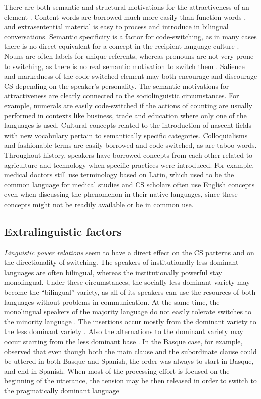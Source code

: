 \documentclass[output=paper,
modfonts
]{langscibook}
\begin{document}
There are both semantic and structural motivations for the attractiveness of an element \parencite{johanson2002contact}. Content words are borrowed much more easily than function words \parencite{backus2013usage}, and extrasentential material is easy to process and introduce in bilingual conversations. Semantic specificity is a factor for code-switching, as in many cases there is no direct equivalent for a concept in the recipient-language culture \parencite{backus2001role}. Nouns are often labels for unique referents, whereas pronouns are not very prone to switching, as there is no real semantic motivation to switch them \parencite[pp. 133]{matras2009language}. Salience and markedness of the code-switched element may both encourage and discourage CS depending on the speaker’s personality. The semantic motivations for attractiveness are clearly connected to the sociolinguistic circumstances. For example, numerals are easily code-switched if the actions of counting are usually performed in contexts like business, trade and education where only one of the languages is used. Cultural concepts related to the introduction of nascent fields with new vocabulary pertain to semantically specific categories. Colloquialisms and fashionable terms are easily borrowed and code-switched, as are taboo words. Throughout history, speakers have borrowed concepts from each other related to agriculture and technology when specific practices were introduced. For example, medical doctors still use terminology based on Latin, which used to be the common language for medical studies and CS scholars often use English concepts even when discussing the phenomenon in their native languages, since these concepts might not be readily available or be in common use.

\subsection{Extralinguistic factors}

\textit{Linguistic power relations} seem to have a direct effect on the CS patterns and on the directionality of switching. The speakers of institutionally less dominant languages are often bilingual, whereas the institutionally powerful stay monolingual. Under these circumstances, the socially less dominant variety may become the “bilingual” variety, as all of its speakers can use the resources of both languages without problems in communication. At the same time, the monolingual speakers of the majority language do not easily tolerate switches to the minority language \parencite{matras2009language}. The insertions occur mostly from the dominant variety to the less dominant variety \parencite{muysken2000}. Also the alternations to the dominant variety may occur starting from the less dominant base \parencite[pp. 14]{gardner2009code}. In the Basque case, for example, \cite{aurrekoetxea2011perpaus} observed that even though both the main clause and the subordinate clause could be uttered in both Basque and Spanish, the order was always to start in Basque, and end in Spanish.  When most of the processing effort is focused on the beginning of the utterance, the tension may be then released in order to switch to the pragmatically dominant language \parencite{matras2009language} 
\end{document}
